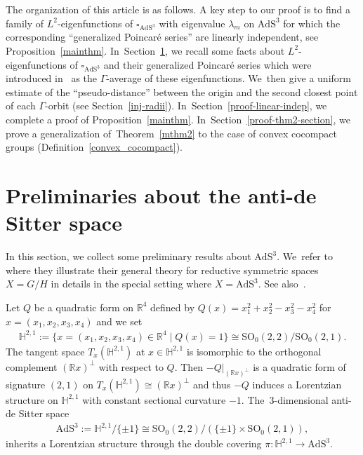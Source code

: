 \documentclass[10pt,a4paper]{amsart}
\numberwithin{equation}{section}
\begin{document}
The organization of this article is as follows.
A key step to our proof is to find a family of $L^2$-eigenfunctions
of $\square_{\mathrm{AdS}^{3}}$ with eigenvalue $\lambda_{m}$ on $\mathrm{AdS}^{3}$
for which the corresponding
``generalized Poincar\'e series'' are linearly independent, see Proposition~\ref{mainthm}. In~Section~\ref{Preliminary-AdS},
we recall some facts about
$L^2$-eigenfunctions of $\square_{\mathrm{AdS}^{3}}$
and their generalized Poincar\'e series which were
introduced in~\cite{KaKob16} as the $\Gamma$-average of these eigenfunctions. We~then give a uniform estimate of the ``pseudo-distance''
between the origin and the second closest point of each $\Gamma$-orbit
(see Section~\ref{inj-radii}). In~Section~\ref{proof-linear-indep}, we complete a proof of Proposition~\ref{mainthm}. In~Section~\ref{proof-thm2-section}, we prove a generalization of~Theorem~\ref{mthm2}
to the case of convex cocompact groups (Definition~\ref{convex_cocompact}).

\section{Preliminaries about the anti-de Sitter space}
\label{Preliminary-AdS}

In this section, we collect some preliminary results about $\mathrm{AdS}^{3}$. We~refer to \cite[Section~9]{KaKob16} where they illustrate their general theory
for reductive symmetric spaces $X=G/H$ in details in the special setting where
$X=\mathrm{AdS}^{3}$. See also~\cite{Kan19}.

Let $Q$ be a quadratic form on $\mathbb{R}^{4}$ defined by
$Q(x) = x_1^2 + x_2^2-x_3^2-x_4^2$ for $x= (x_1,x_2,x_3,x_4)$ and
we set
\begin{gather*}
\mathbb{H}^{2,1}:=\big\{x=(x_1,x_2,x_3,x_4) \in \mathbb{R}^4 \mid Q(x) = 1\big\}
\cong \mathrm{SO}_{0}(2,2)/\mathrm{SO}_{0}(2,1).
\end{gather*}
The tangent space $T_{x}(\mathbb{H}^{2,1})$ at $x\in\mathbb{H}^{2,1}$
is isomorphic to the orthogonal complement $(\mathbb{R} x)^{\bot}$ with respect to $Q$.
Then $-Q|_{(\mathbb{R} x)^{\bot}}$ is
a quadratic form of signature $(2,1)$ on
$T_{x}(\mathbb{H}^{2,1}) \cong (\mathbb{R} x)^{\bot}$ and
thus $-Q$ induces a Lorentzian structure on $\mathbb{H}^{2,1}$
with constant sectional curvature $-1$.
The~$3$-di\-men\-sional anti-de Sitter space
\begin{gather*}
\mathrm{AdS}^{3}:=\mathbb{H}^{2,1}/\{\pm 1\}
\cong \mathrm{SO}_{0}(2,2)/(\{\pm1\}\times\mathrm{SO}_{0}(2,1)),
\end{gather*}
inherits a Lorentzian structure through
the double covering $\pi\colon\mathbb{H}^{2,1}\rightarrow\mathrm{AdS}^{3}$.
\end{document}
